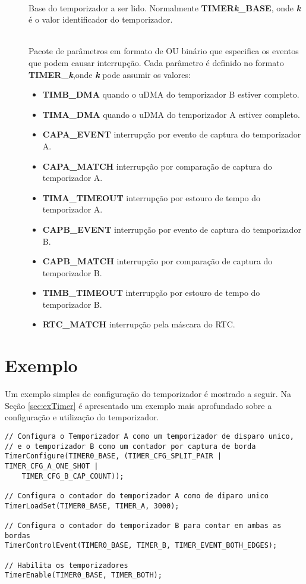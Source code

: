 \begin{description}
	\item []\hfill \\
	Base do temporizador a ser lido. Normalmente \textbf{TIMER\emph{k}\_BASE}, onde \textbf{\emph{k}} é o valor identificador do temporizador.
	
	\item []\hfill \\
	Pacote de parâmetros em formato de OU binário que especifica os eventos que podem causar interrupção. Cada parâmetro é definido no formato \textbf{TIMER\_\emph{k}},onde \textbf{\emph{k}} pode assumir os valores:
	\begin{itemize}
		\item \textbf{TIMB\_DMA} quando o uDMA do temporizador B estiver completo.
		\item \textbf{TIMA\_DMA} quando o uDMA do temporizador A estiver completo.
		\item \textbf{CAPA\_EVENT} interrupção por evento de captura do temporizador A.
		\item \textbf{CAPA\_MATCH} interrupção por comparação de captura do temporizador A.
		\item \textbf{TIMA\_TIMEOUT} interrupção por estouro de tempo do temporizador A.
		\item \textbf{CAPB\_EVENT} interrupção por evento de captura do temporizador B.
		\item \textbf{CAPB\_MATCH} interrupção por comparação de captura do temporizador B.
		\item \textbf{TIMB\_TIMEOUT} interrupção por estouro de tempo do temporizador B.
		\item \textbf{RTC\_MATCH} interrupção pela máscara do RTC.
	\end{itemize}
\end{description}

\section{Exemplo}

Um exemplo simples de configuração do temporizador é mostrado a seguir. Na Seção \ref{sec:exTimer} é apresentado um exemplo mais aprofundado sobre a configuração e utilização do temporizador.

\begin{lstlisting}[style=citacao]
// Configura o Temporizador A como um temporizador de disparo unico,
// e o temporizador B como um contador por captura de borda
TimerConfigure(TIMER0_BASE, (TIMER_CFG_SPLIT_PAIR | TIMER_CFG_A_ONE_SHOT |
	TIMER_CFG_B_CAP_COUNT));

// Configura o contador do temporizador A como de diparo unico
TimerLoadSet(TIMER0_BASE, TIMER_A, 3000);

// Configura o contador do temporizador B para contar em ambas as bordas
TimerControlEvent(TIMER0_BASE, TIMER_B, TIMER_EVENT_BOTH_EDGES);

// Habilita os temporizadores
TimerEnable(TIMER0_BASE, TIMER_BOTH);
\end{lstlisting}



